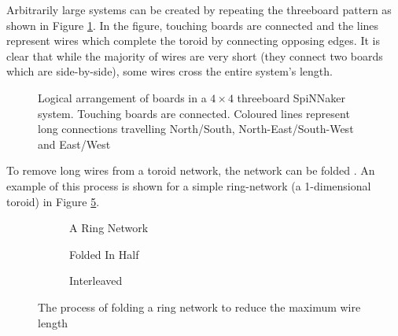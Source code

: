 			Arbitrarily large systems can be created by repeating the threeboard
			pattern as shown in Figure \ref{fig:boardsLogical}. In the figure,
			touching boards are connected and the lines represent wires which complete
			the toroid by connecting opposing edges. It is clear that while the
			majority of wires are very short (they connect two boards which are
			side-by-side), some wires cross the entire system's length.
			
			\begin{figure}
				\center
				
				\caption[Logical arrangement of boards in a $4\times4$ threeboard
				SpiNNaker system.]{Logical arrangement of boards in a $4\times4$
				threeboard SpiNNaker system. Touching boards are connected. Coloured
				lines represent long connections travelling {\color{red}North/South},
				{\color{green}North-East/South-West} and {\color{blue}East/West}}
				\label{fig:boardsLogical}
			\end{figure}
			
			\label{sec:folding-toroids}
			
			To remove long wires from a toroid network, the network can be folded
			\cite{dally04}. An example of this process is shown for a simple
			ring-network (a 1-dimensional toroid) in Figure \ref{fig:folding}.
			
			\begin{figure}
				\begin{subfigure}[b]{\textwidth}
					\center
					
					\caption{A Ring Network}
					\label{fig:ringLong}
				\end{subfigure}
				
				\vspace{2ex}
				
				\begin{subfigure}[b]{\textwidth}
					\center
					
					\caption{Folded In Half}
					\label{fig:ringFolded}
				\end{subfigure}
				
				\vspace{2ex}
				
				\begin{subfigure}[b]{\textwidth}
					\center
					
					\caption{Interleaved}
					\label{fig:ringInterleaved}
				\end{subfigure}
				
				\caption[Folding a ring network to reduce the maximum wire length]{The
				process of folding a ring network to reduce the maximum wire length}
				\label{fig:folding}
			\end{figure}
			
